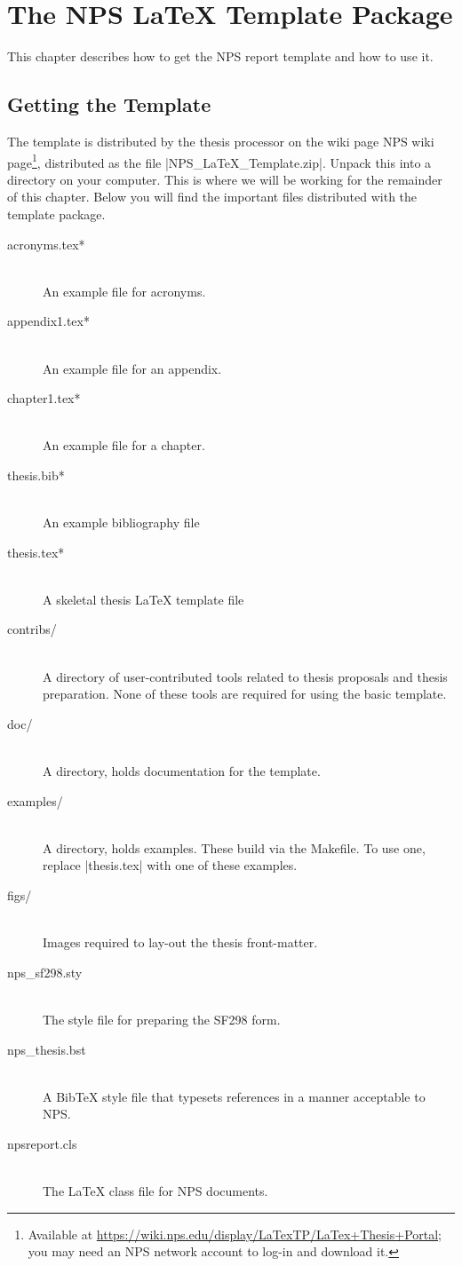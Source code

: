 \chapter{The NPS \LaTeX{} Template Package}
This chapter describes how to get the NPS report template and how to
use it.

\section{Getting the Template}
The template is distributed by the thesis processor on the
wiki page NPS wiki page\footnote{Available at \url{https://wiki.nps.edu/display/LaTexTP/LaTex+Thesis+Portal};
you may need an NPS network account to log-in and download it.}, distributed as the file |NPS_LaTeX_Template.zip|. 
Unpack this into a directory on your computer. This is where we will be working for the
remainder of this chapter.
Below you will find the important files distributed with the template package.

\begin{description}
\item[acronyms.tex*] \hfill \\ 
An example file for acronyms.
\item[appendix1.tex*] \hfill \\ 
An example file for an appendix.
\item[chapter1.tex*] \hfill \\ 
An example file for a chapter.
\item[thesis.bib*] \hfill \\ 
An example bibliography file
\item[thesis.tex*] \hfill \\ 
A skeletal thesis \LaTeX{} template file
\item[contribs/] \hfill \\ 
A directory of user-contributed tools related to thesis proposals and thesis preparation. None of these tools are required for using the basic template.
\item[doc/] \hfill \\ 
A directory, holds documentation for the template.
\item[examples/] \hfill \\ 
A directory, holds examples. These build via the Makefile. To use one, replace |thesis.tex| with one of these examples.
\item[figs/] \hfill \\
Images required to lay-out the thesis front-matter.
\item[nps\_sf298.sty] \hfill \\ 
The style file for preparing the SF298 form.
\item[nps\_thesis.bst] \hfill \\ 
A Bib\TeX{} style file that typesets references in a manner acceptable to NPS.
\item[npsreport.cls] \hfill \\ 
The \LaTeX{} class file for NPS documents.
\end{description}

